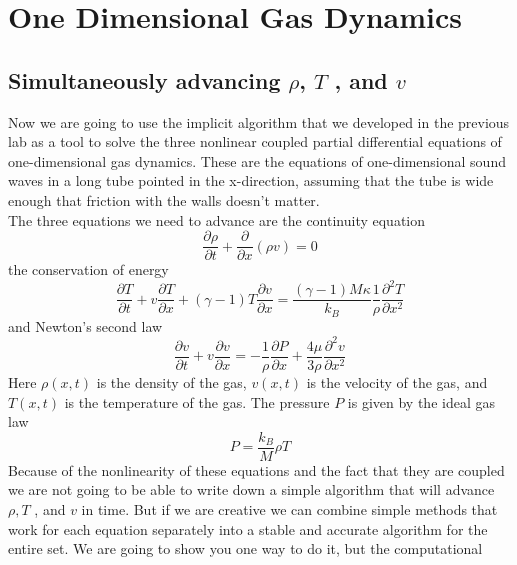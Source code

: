 \documentclass{book}
\theoremstyle{plain}
\theoremstyle{definition}
\numberwithin{exm}{chapter}
\theoremstyle{remark}
\theoremstyle{summary}
\theoremstyle{overview}
\begin{document}
\chapter*{One Dimensional Gas Dynamics}
\section*{Simultaneously advancing $\rho$, $T$ , and $v$}
Now we are going to use the implicit algorithm that we developed in the previous
lab as a tool to solve the three nonlinear coupled partial differential equations
of one-dimensional gas dynamics. These are the equations of one-dimensional
sound waves in a long tube pointed in the x-direction, assuming that the tube is
wide enough that friction with the walls doesn\rq t matter. \\ 
The three equations we need to advance are the continuity equation
\begin{equation}\label{eq:1101}
\frac{\partial \rho}{\partial t}+\frac{\partial}{\partial x}(\rho v)=0
\end{equation}
the conservation of energy
\begin{equation}\label{eq:1102}
\frac{\partial T}{\partial t}+v \frac{\partial T}{\partial x}+(\gamma-1) T \frac{\partial v}{\partial x}=\frac{(\gamma-1) M \kappa}{k_{B}} \frac{1}{\rho} \frac{\partial^{2} T}{\partial x^{2}}
\end{equation}
and Newton\rq s second law
\begin{equation}\label{eq:1103}
\frac{\partial v}{\partial t}+v \frac{\partial v}{\partial x}=-\frac{1}{\rho} \frac{\partial P}{\partial x}+\frac{4 \mu}{3 \rho} \frac{\partial^{2} v}{\partial x^{2}}
\end{equation}
Here $\rho(x,t)$ is the density of the gas, $v(x,t)$ is the velocity of the gas, and $T(x,t)$ is
the temperature of the gas. The pressure $P$ is given by the ideal gas law
\begin{equation}\label{eq:1104}
P=\frac{k_{B}}{M} \rho T
\end{equation}
Because of the nonlinearity of these equations and the fact that they are
coupled we are not going to be able to write down a simple algorithm that will advance $\rho, T$ , and $v$ in time. But if we are creative we can combine simple methods
that work for each equation separately into a stable and accurate algorithm for
the entire set. We are going to show you one way to do it, but the computational
\end{document}
